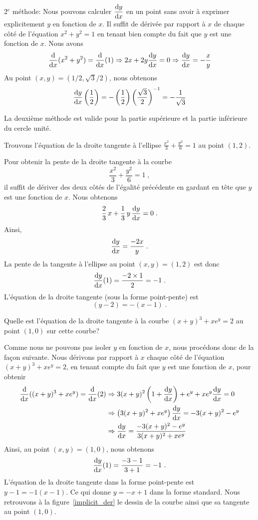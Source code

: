 {\begin{egg}
2$^e$ méthode:  Nous pouvons calculer $\displaystyle \dydx{y}{x}$ en un
point sans avoir à exprimer explicitement $y$ en fonction de $x$.
Il suffit de dérivée par rapport à $x$ de chaque côté de
l'équation $x^2 + y^2 = 1$ en tenant bien compte du fait que $y$ est
une fonction de $x$.  Nous avons
\[
\dfdx{(x^2+y^2)}{x} = \dfdx{(1)}{x}
\Rightarrow 2x + 2y \dydx{y}{x} = 0 \\
\Rightarrow \dydx{y}{x} = - \frac{x}{y}
\]
Au point $(x,y) = (1/2, \sqrt{3}/2)$, nous obtenons
\[
\dydx{y}{x}\left(\frac{1}{2}\right) = -\left(\frac{1}{2}\right)
\left( \frac{\sqrt{3}}{2} \right)^{-1} = - \frac{1}{\sqrt{3}}
\]

La deuxième méthode est valide pour la partie
supérieure et la partie inférieure du cercle unité.
\end{egg}


\begin{egg}
Trouvons l'équation de la droite tangente à l'ellipse
$\displaystyle \frac{x^2}{3} + \frac{y^2}{6} = 1$ au point $(1,2)$.

Pour obtenir la pente de la droite tangente à la courbe
\[
\frac{x^2}{3} + \frac{y^2}{6} = 1 \; ,
\]
il suffit de dériver des deux côtés de l'égalité précédente en gardant
en tête que $y$ est une fonction de $x$.  Nous obtenons
\[
\frac{2}{3}\, x + \frac{1}{3} \, y \,\dydx{y}{x} = 0 \; .
\]
Ainsi,
\[
\dydx{y}{x} = \frac{-2x}{y} \; .
\]
La pente de la tangente à l'ellipse au point $(x,y) = (1,2)$ est donc
\[
\dydx{y}{x}(1) = \frac{-2\times 1}{2} = -1 \; .
\]
L'équation de la droite tangente (sous la forme point-pente) est
\[
(y-2) = -(x-1) \; .
\]
\end{egg}

\begin{egg}
Quelle est l'équation de la droite tangente à la courbe
$(x+y)^3 + x e^y = 2$ au point $(1,0)$ sur cette courbe?

Comme nous ne pouvons pas isoler $y$ en fonction de $x$, nous
procédons donc de la façon suivante.  Nous dérivons par rapport à $x$
chaque côté de l'équation $(x+y)^3 + x e^y = 2$, en tenant compte du
fait que $y$ est une fonction de $x$, pour obtenir
\begin{align*}
\dfdx{((x+y)^3 + x e^y)}{x} = \dfdx{(2)}{x}
& \Rightarrow 3(x+y)^2\left(1+\dydx{y}{x}\right)
+ e^y + xe^y \dydx{y}{x} = 0 \\
& \Rightarrow \left( 3(x+y)^2 + xe^y\right) \dydx{y}{x}
= -3(x+y)^2 - e^y \\
& \Rightarrow \dydx{y}{x}
= \frac{-3(x+y)^2 - e^y}{3(x+y)^2 + xe^y}
\end{align*}
Ainsi, au point $(x,y) = (1,0)$, nous obtenons
\[
\dydx{y}{x}(1) = \frac{-3 - 1}{3 + 1} = -1 \ .
\]
L'équation de la droite tangente dans la forme point-pente est
$\displaystyle y -1 = -1 (x-1)$.  Ce qui donne $y = -x + 1$
dans la forme standard.   Nous retrouvons à la
figure~\ref{implicit_der} le dessin de la courbe ainsi que sa tangente
au point $(1,0)$.
\end{egg}

}

